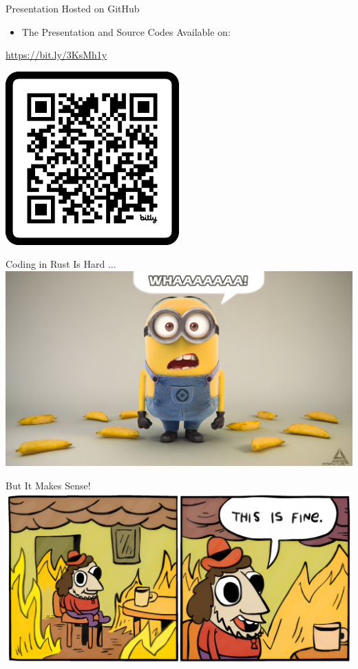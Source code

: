 \documentclass[10pt]{beamer}
\begin{document}
\begin{frame}{Presentation Hosted on GitHub}
    \begin{itemize}
        \item The Presentation and Source Codes Available on:
    \end{itemize}

    \begin{center}
        \url{https://bit.ly/3KsMh1y}    
    \end{center}    

    \begin{center}
        \includegraphics[width=0.5\textwidth]{img/qr.pdf}
    \end{center}
\end{frame}

\begin{frame}{Coding in Rust Is Hard ...}
    \includegraphics[width=\textwidth]{img/minion.jpeg}
\end{frame}

\begin{frame}{But It Makes Sense!}
    \includegraphics[width=\textwidth]{img/meme.png}
\end{frame}
\end{document}
